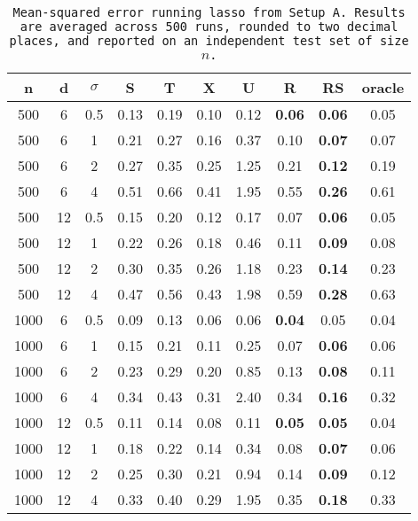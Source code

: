 \begin{table}[ht]
\centering
\begin{tabular}{cccccccccc}
  \hline
n & d & $\sigma$ & S & T & X & U & R & RS & oracle \\ 
  \hline
500 & 6 & 0.5 & 0.13 & 0.19 & 0.10 & 0.12 & \bf 0.06 & \bf 0.06 & 0.05 \\ 
  500 & 6 & 1 & 0.21 & 0.27 & 0.16 & 0.37 & 0.10 & \bf 0.07 & 0.07 \\ 
  500 & 6 & 2 & 0.27 & 0.35 & 0.25 & 1.25 & 0.21 & \bf 0.12 & 0.19 \\ 
  500 & 6 & 4 & 0.51 & 0.66 & 0.41 & 1.95 & 0.55 & \bf 0.26 & 0.61 \\ 
  500 & 12 & 0.5 & 0.15 & 0.20 & 0.12 & 0.17 & 0.07 & \bf 0.06 & 0.05 \\ 
  500 & 12 & 1 & 0.22 & 0.26 & 0.18 & 0.46 & 0.11 & \bf 0.09 & 0.08 \\ 
  500 & 12 & 2 & 0.30 & 0.35 & 0.26 & 1.18 & 0.23 & \bf 0.14 & 0.23 \\ 
  500 & 12 & 4 & 0.47 & 0.56 & 0.43 & 1.98 & 0.59 & \bf 0.28 & 0.63 \\ 
  1000 & 6 & 0.5 & 0.09 & 0.13 & 0.06 & 0.06 & \bf 0.04 & 0.05 & 0.04 \\ 
  1000 & 6 & 1 & 0.15 & 0.21 & 0.11 & 0.25 & 0.07 & \bf 0.06 & 0.06 \\ 
  1000 & 6 & 2 & 0.23 & 0.29 & 0.20 & 0.85 & 0.13 & \bf 0.08 & 0.11 \\ 
  1000 & 6 & 4 & 0.34 & 0.43 & 0.31 & 2.40 & 0.34 & \bf 0.16 & 0.32 \\ 
  1000 & 12 & 0.5 & 0.11 & 0.14 & 0.08 & 0.11 & \bf 0.05 & \bf 0.05 & 0.04 \\ 
  1000 & 12 & 1 & 0.18 & 0.22 & 0.14 & 0.34 & 0.08 & \bf 0.07 & 0.06 \\ 
  1000 & 12 & 2 & 0.25 & 0.30 & 0.21 & 0.94 & 0.14 & \bf 0.09 & 0.12 \\ 
  1000 & 12 & 4 & 0.33 & 0.40 & 0.29 & 1.95 & 0.35 & \bf 0.18 & 0.33 \\ 
   \hline
\end{tabular}
\caption{\tt Mean-squared error running \texttt{lasso} from Setup A. Results are averaged across 500 runs, rounded to two decimal places, and reported on an independent test set of size $n$.} 
\label{table:setup1}
\end{table}
